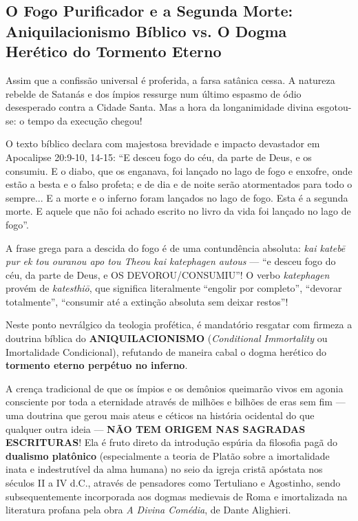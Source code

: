 \subsection{O Fogo Purificador e a Segunda Morte: Aniquilacionismo Bíblico vs. O Dogma Herético do Tormento Eterno}


Assim que a confissão universal é proferida, a farsa satânica cessa. A natureza rebelde de Satanás e dos ímpios ressurge num último espasmo de ódio desesperado contra a Cidade Santa. Mas a hora da longanimidade divina esgotou-se: o tempo da execução chegou!

O texto bíblico declara com majestosa brevidade e impacto devastador em Apocalipse 20:9-10, 14-15:
``E desceu fogo do céu, da parte de Deus, e os consumiu. E o diabo, que os enganava, foi lançado no lago de fogo e enxofre, onde estão a besta e o falso profeta; e de dia e de noite serão atormentados para todo o sempre... E a morte e o inferno foram lançados no lago de fogo. Esta é a segunda morte. E aquele que não foi achado escrito no livro da vida foi lançado no lago de fogo''.

A frase grega para a descida do fogo é de uma contundência absoluta: \textit{kai katebē pur ek tou ouranou apo tou Theou kai katephagen autous} — ``e desceu fogo do céu, da parte de Deus, e OS DEVOROU/CONSUMIU''! O verbo \textit{katephagen} provém de \textit{katesthiō}, que significa literalmente ``engolir por completo'', ``devorar totalmente'', ``consumir até a extinção absoluta sem deixar restos''!

Neste ponto nevrálgico da teologia profética, é mandatório resgatar com firmeza a doutrina bíblica do \textbf{ANIQUILACIONISMO} (\textit{Conditional Immortality} ou Imortalidade Condicional), refutando de maneira cabal o dogma herético do \textbf{tormento eterno perpétuo no inferno}.

A crença tradicional de que os ímpios e os demônios queimarão vivos em agonia consciente por toda a eternidade através de milhões e bilhões de eras sem fim — uma doutrina que gerou mais ateus e céticos na história ocidental do que qualquer outra ideia — \textbf{NÃO TEM ORIGEM NAS SAGRADAS ESCRITURAS}!
Ela é fruto direto da introdução espúria da filosofia pagã do \textbf{dualismo platônico} (especialmente a teoria de Platão sobre a imortalidade inata e indestrutível da alma humana) no seio da igreja cristã apóstata nos séculos II a IV d.C., através de pensadores como Tertuliano e Agostinho, sendo subsequentemente incorporada aos dogmas medievais de Roma e imortalizada na literatura profana pela obra \textit{A Divina Comédia}, de Dante Alighieri.

